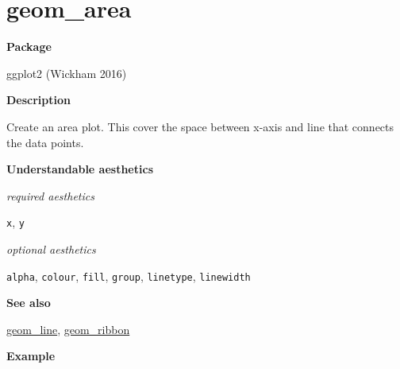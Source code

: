 \documentclass[
  letterpaper,
  DIV=11,
  numbers=noendperiod]{scrreprt}
\begin{document}
\section{geom\_area}\label{area}

\textbf{Package}

ggplot2 (Wickham 2016)

\textbf{Description}

Create an area plot. This cover the space between x-axis and line that
connects the data points.

\textbf{Understandable aesthetics}

\emph{required aesthetics}

\texttt{x}, \texttt{y}

\emph{optional aesthetics}

\texttt{alpha}, \texttt{colour}, \texttt{fill}, \texttt{group},
\texttt{linetype}, \texttt{linewidth}

\textbf{See also}

\hyperref[line]{geom\_line}, \hyperref[ribbon]{geom\_ribbon}

\textbf{Example}
\end{document}
